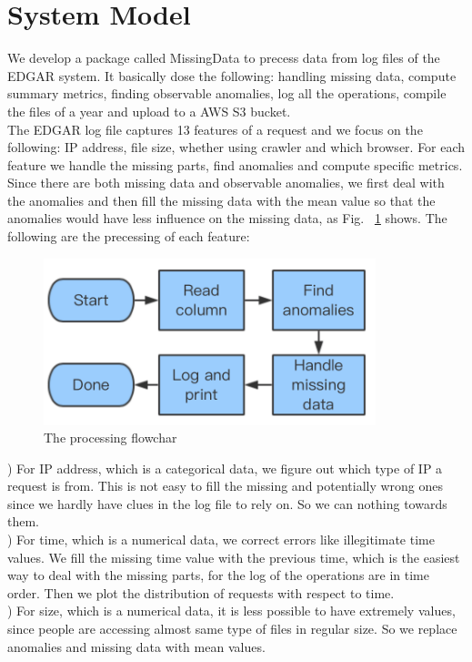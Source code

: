 \documentclass[conference]{IEEEtran}
\begin{document}
\section{System Model}\label{ii}
\indent We develop a package called MissingData to precess data from log files of the EDGAR system. It basically dose the following: handling missing data, compute summary metrics, finding observable anomalies, log all the operations, compile the files of a year and upload to a AWS S3 bucket.
\\
\indent The EDGAR log file captures 13 features of a request and we focus on the following: IP address, file size, whether using crawler and which browser. For each feature we handle the missing parts, find anomalies and compute specific metrics. Since there are both missing data and observable anomalies, we first deal with the anomalies and then fill the missing data with the mean value so that the anomalies would have less influence on the missing data, as Fig. ~\ref{flowchart} shows. The following are the precessing of each feature:
\\
%
\begin{figure}
\centering
\includegraphics[width=3.8in]{flowchart.png}
\caption{The processing flowchar}\label{flowchart}
\end{figure}
%
) For IP address, which is a categorical data, we figure out which type of IP a request is from. This is not easy to fill the missing and potentially wrong ones since we hardly have clues in the log file to rely on. So we can nothing towards them.
\\
) For time, which is a numerical data, we correct errors like illegitimate time values. We fill the missing time value with the previous time, which is the easiest way to deal with the missing parts, for the log of the operations are in time order. Then we plot the distribution of requests with respect to time.
\\
) For size, which is a numerical data, it is less possible to have extremely values, since people are accessing almost same type of files in regular size. So we replace anomalies and missing data with mean values.
\end{document}
